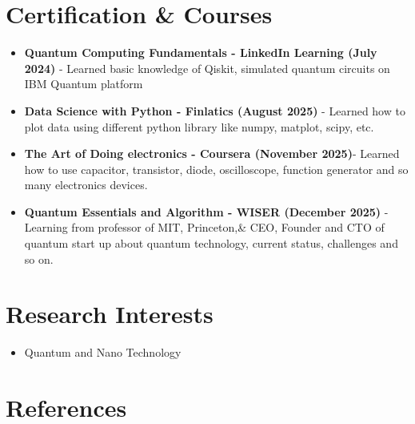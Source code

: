 \documentclass[a4paper,10pt]{article}
\begin{document}
\section*{Certification \& Courses}
\begin{itemize}[leftmargin=*]
\item \textbf{Quantum Computing Fundamentals - LinkedIn Learning (July 2024)} - Learned basic knowledge of Qiskit, simulated quantum circuits on IBM Quantum 
platform 
\item \textbf{Data Science with Python - Finlatics (August 2025)} - Learned how to plot data using different python library like numpy, matplot, scipy, etc.
\item \textbf{The Art of Doing electronics - Coursera (November 2025)}- Learned how to use capacitor, transistor, diode, oscilloscope, function generator and so many electronics devices.
\item\textbf{Quantum Essentials and Algorithm - WISER (December 2025)} - Learning from professor of MIT, Princeton,\&  CEO, Founder and CTO of quantum start up about quantum technology, current status, challenges and so on.
\end{itemize}
\section*{Research Interests}

\begin{itemize}[leftmargin=*]
    \item Quantum and Nano Technology
\end{itemize}

\section*{References}
\end{document}
